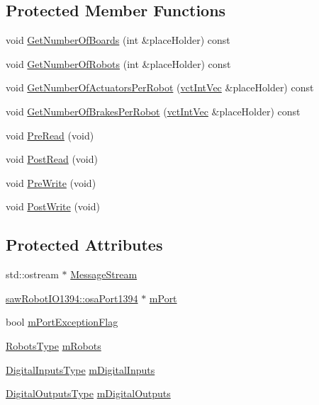 \subsection*{Protected Member Functions}
\begin{DoxyCompactItemize}
\item 
void \hyperlink{classmts_robot_i_o1394_a47ed9c5990941c91395bee4ee5b34e64}{Get\-Number\-Of\-Boards} (int \&place\-Holder) const 
\item 
void \hyperlink{classmts_robot_i_o1394_ae125b7080fd3942ff3678465fa7283e6}{Get\-Number\-Of\-Robots} (int \&place\-Holder) const 
\item 
void \hyperlink{classmts_robot_i_o1394_adc86375c8f4679b60a646bd87c03577a}{Get\-Number\-Of\-Actuators\-Per\-Robot} (\hyperlink{vct_dynamic_vector_types_8h_a47260df0b570a25352b3f318ed0b4c4e}{vct\-Int\-Vec} \&place\-Holder) const 
\item 
void \hyperlink{classmts_robot_i_o1394_ac1408fa7ac109761a52db854208f5db6}{Get\-Number\-Of\-Brakes\-Per\-Robot} (\hyperlink{vct_dynamic_vector_types_8h_a47260df0b570a25352b3f318ed0b4c4e}{vct\-Int\-Vec} \&place\-Holder) const 
\item 
void \hyperlink{classmts_robot_i_o1394_aa975184d52423bcf59adb23b437924ec}{Pre\-Read} (void)
\item 
void \hyperlink{classmts_robot_i_o1394_a7c6fd64021f6d7d2497d76f1a4dfeae6}{Post\-Read} (void)
\item 
void \hyperlink{classmts_robot_i_o1394_a676bb81798faaf225e587f2775478a0b}{Pre\-Write} (void)
\item 
void \hyperlink{classmts_robot_i_o1394_a64991a4744e0701193bc6d80da015eb0}{Post\-Write} (void)
\end{DoxyCompactItemize}
\subsection*{Protected Attributes}
\begin{DoxyCompactItemize}
\item 
std\-::ostream $\ast$ \hyperlink{classmts_robot_i_o1394_a8d67ddd80442e47e158141ab5bcfdf1a}{Message\-Stream}
\item 
\hyperlink{classsaw_robot_i_o1394_1_1osa_port1394}{saw\-Robot\-I\-O1394\-::osa\-Port1394} $\ast$ \hyperlink{classmts_robot_i_o1394_a9bb22957cd6623ad743e6abf60ea187e}{m\-Port}
\item 
bool \hyperlink{classmts_robot_i_o1394_a626f9d05e25b4c61c71bb215d75ffcc0}{m\-Port\-Exception\-Flag}
\item 
\hyperlink{classmts_robot_i_o1394_ab8da6d2d438f82df01169c5bd528c9b3}{Robots\-Type} \hyperlink{classmts_robot_i_o1394_a267e4918bbef8f40fcedffe3a9a6204d}{m\-Robots}
\item 
\hyperlink{classmts_robot_i_o1394_ad8b711c653d6fc68084cbe7817e066b9}{Digital\-Inputs\-Type} \hyperlink{classmts_robot_i_o1394_ae9b99471cc8a0b6c9b45cb987c1ac37c}{m\-Digital\-Inputs}
\item 
\hyperlink{classmts_robot_i_o1394_af0825d8e6c2f7bb0ff1fcd85319ffa30}{Digital\-Outputs\-Type} \hyperlink{classmts_robot_i_o1394_a23e225b6c79ab0c40909c93b1985d8e7}{m\-Digital\-Outputs}
\end{DoxyCompactItemize}
